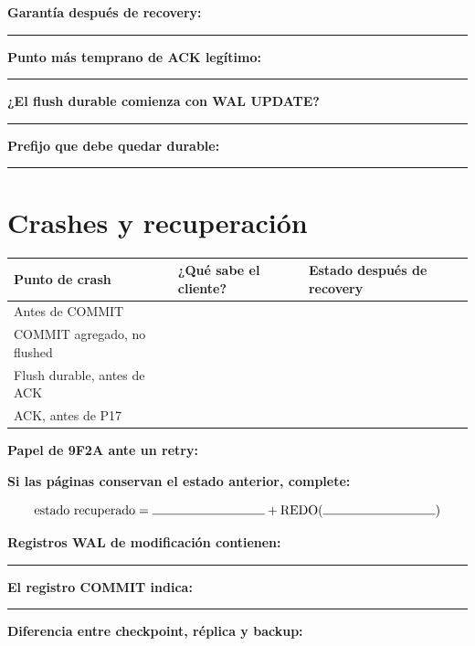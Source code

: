 \documentclass[variant=guia,cover=institutional,mode=print]{ua-engineering-v6-article}
\begin{document}
\noindent\textbf{Garantía después de recovery:}\\[0.18cm]\rule{\textwidth}{0.4pt}

\noindent\textbf{Punto más temprano de ACK legítimo:}\\[0.18cm]\rule{\textwidth}{0.4pt}

\noindent\textbf{¿El flush durable comienza con WAL UPDATE?}\\[0.18cm]\rule{\textwidth}{0.4pt}

\noindent\textbf{Prefijo que debe quedar durable:}\\[0.18cm]\rule{\textwidth}{0.4pt}

\newpage
\section{Crashes y recuperación}

\begin{center}
\begin{tabular}{p{}p{}p{}}
\toprule
Punto de crash & ¿Qué sabe el cliente? & Estado después de recovery \\
\midrule
Antes de COMMIT & & \\[1.2cm]
COMMIT agregado, no flushed & & \\[1.2cm]
Flush durable, antes de ACK & & \\[1.2cm]
ACK, antes de P17 & & \\[1.2cm]
\bottomrule
\end{tabular}
\end{center}

\textbf{Papel de 9F2A ante un retry:}

\vspace{1.0cm}

\textbf{Si las páginas conservan el estado anterior, complete:}

\[
\text{estado recuperado} = \rule{3.1cm}{0.4pt} + \operatorname{REDO}(\rule{3.1cm}{0.4pt})
\]

\textbf{Registros WAL de modificación contienen:} \rule{0.48\textwidth}{0.4pt}

\textbf{El registro COMMIT indica:} \rule{0.53\textwidth}{0.4pt}

\vspace{0.4cm}

\textbf{Diferencia entre checkpoint, réplica y backup:}

\vspace{1.7cm}
\end{document}
